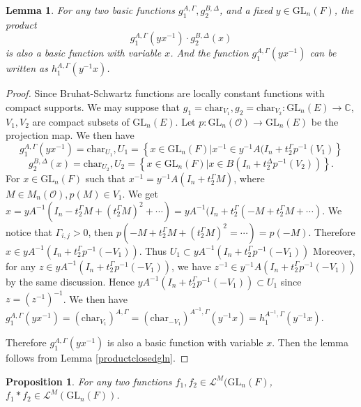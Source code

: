 \documentclass{amsart}
\newtheorem{lemma}[theorem]{Lemma}
\newtheorem{proposition}[theorem]{Proposition}
\theoremstyle{definition}
\theoremstyle{remark}
\numberwithin{equation}{section}
\def  \Char     {\mathrm{char}}
\def  \GL        {\mathrm{GL}}
\def  \cl       {\mathcal{L}}
\def  \co       {\mathcal{O}}
\def  \bc       {\mathbb{C}}
\begin{document}
\begin{lemma}
	 For any two basic functions $g_1^{A, \Gamma}, g_2^{B, \Delta}$, and  a fixed $y \in \GL_n(F)$, the product
	 $$
	   g_1^{A, \Gamma}(y
	    x^{-1}) \cdot g_2^{B,  \Delta}(x) 
	 $$
	  is also a basic function with variable $x$.   And the function $g_1^{A, \Gamma}(yx^{-1})$ can be written as $h_1^{A, \Gamma}(y^{-1}x)$.
\end{lemma}
\begin{proof}
	 Since Bruhat-Schwartz functions are locally constant functions with compact supports.  We  may suppose that $g_1 =\Char_{V_1} , g_2= \Char_{V_2}: \GL_n(E) \to \bc$, $V_1, V_2$ are compact subsets of $\GL_n(E)$.   Let $p: \GL_n( \co) \to \GL_n(E)$  be the projection map. We then have
	 $$
	 g_1^{A, \Gamma} (yx^{-1})= \Char_{U_1}, U_1= \left\{x \in \GL_n(F)| x^{-1} \in  y^{-1}A(I_n+ t_2^{\Gamma}p^{-1} (V_1) \right\}
	 $$
    $$
    g_2^{B,  \Delta}(x) = \Char_{U_2}, U_2= \left\{x \in \GL_n(F)| x  \in  B(I_n+ t_2^{\Delta}p^{-1} (V_2)) \right\}.
    $$
     For $x \in \GL_n(F)$ such that $ x^{-1} =y^{-1}A(I_n +t_2^{\Gamma}M )$,   where $M \in M_n(\co),  p(M) \in V_1$.  We get $x = yA^{-1} (I_n - t_2^{\Gamma} M + (t_2^{\Gamma} M )^2 + \cdots ) = yA^{-1}(I_n +t_2^{\Gamma}( -M + t_2^{\Gamma}M +\cdots )$.  We notice that  $\Gamma_{i,j} > 0$, then $p(-M+ t_2^{\Gamma}M+ (t_2^{\Gamma}M)^2 =\cdots ) = p(-M)$.  Therefore $x \in  yA^{-1}(I_n +t_2^{\Gamma}p^{-1}(-V_1))$. Thus $U_1 \subset yA^{-1}(I_n +t_2^{\Gamma}p^{-1}(-V_1))$ Moreover, for any $z \in  yA^{-1}(I_n +t_2^{\Gamma}p^{-1}(-V_1))$, we have $z^{-1} \in  y^{-1}A(I_n +t_2^{\Gamma}p^{-1}(-V_1))$ by the same discussion.  Hence $y A^{-1}(I_n +t_2^{\Gamma}p^{-1}(-V_1)) \subset U_1$ since $z= (z^{-1})^{-1}$. We then have $g_1^{A, \Gamma}(y x^{-1}) =  (\Char_{V_1})^{A, \Gamma} = (\Char_{-V_1})^{A^{-1}, \Gamma}(y^{-1}x) =h_1^{A^{-1}, \Gamma}(y^{-1}x)$.
     
      Therefore $g_1^{A, \Gamma}(yx^{-1})$ is also a basic function with variable $x$. Then the lemma follows from Lemma \ref{productclosedgln}.
     
\end{proof}




\begin{proposition}
	For any two functions $f_1, f_2 \in   \cl^M(\GL_n(F)$, $f_1*  f_2  \in \cl^M(\GL_n(F))$.
\end{proposition}
\end{document}
